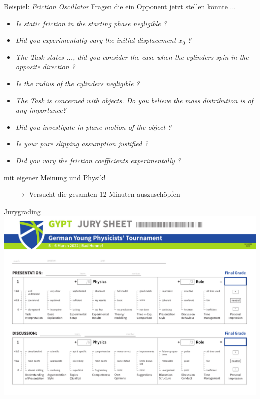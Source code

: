 \documentclass[9pt]{beamer}
\begin{document}
\begin{frame}{Beispiel: \emph{Friction Oscillator}}
  Fragen die ein Opponent jetzt stellen könnte ...
  {\small
  \begin{itemize}
    \item \emph{Is static friction in the starting phase negligible ?}
    \item \emph{Did you experimentally vary the initial displacement $x_0$ ?}
    \item \emph{The Task states ..., did you consider the case when the cylinders spin in the opposite direction ?}
    \item \emph{Is the radius of the cylinders negligible  ?}
    \item \emph{The Task is concerned with objects. Do you believe the mass distribution is of any importance?}
    \item \emph{Did you investigate in-plane motion of the object ?}
    \item \emph{Is your pure slipping assumption justified ?}
    \item \emph{Did you vary the friction coefficients experimentally ?}
  \end{itemize}
  }
  \underline{mit eigener Meinung und Physik! }
  \vfill

  \pause 
  \begin{itemize}
    \item[$\rightarrow$] Versucht die gesamten 12 Minuten auszuschöpfen
  \end{itemize}
\end{frame}

\begin{frame}{Jurygrading}
\includegraphics[width=\textwidth]{photos/jury_sheet}
\end{frame}
\end{document}
